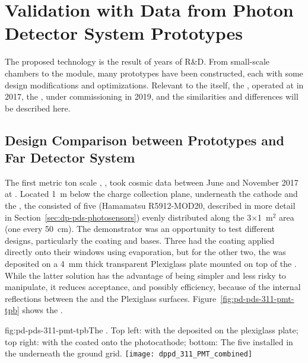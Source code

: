 \section{Validation with Data from Photon Detector System Prototypes}
\label{sec:dp-pds-prototypes}

The    proposed technology is the result of years of R\&D. From small-scale chambers to the  module, many prototypes have been constructed, each with some design modifications and optimizations. 
Relevant to the  itself, the , operated at  in 2017, the , under commissioning in 2019, and the   similarities and differences will be described here.

\subsection{Design Comparison between Prototypes and Far Detector System}
The first metric ton scale  , , took cosmic data between June and November \num{2017} at . 
Located \SI{1}{m} below the charge collection plane, underneath the cathode and the , the  consisted of five  (Hamamatsu R5912-MOD20, described in more detail in Section~\ref{sec:dp-pds-photosensors}) evenly distributed along the 3$\times$1~m$^2$ area (one  every \SI{50}{cm}). The demonstrator was an opportunity to test different  designs, particularly the  coating and  bases. Three  had the  coating applied directly onto their windows using evaporation, but for the other two, the  was deposited on a \SI{4}{\mm} thick transparent Plexiglass plate mounted on top of the . 
While the latter solution has the advantage of being simpler and less risky to manipulate, it reduces acceptance, and possibly efficiency, because of the internal reflections between the  and the Plexiglass surfaces. 
Figure~\ref{fig:pd-pds-311-pmt-tpb} shows the  .

\begin{dunefigure}{fig:pd-pds-311-pmt-tpb}{The  . Top left:  with the  deposited on the plexiglass plate; top right:  with the  coated onto the photocathode; bottom: The five  installed in the  underneath the ground grid.}
\texttt{[image: dppd\_311\_PMT\_combined]}
\end{dunefigure}

